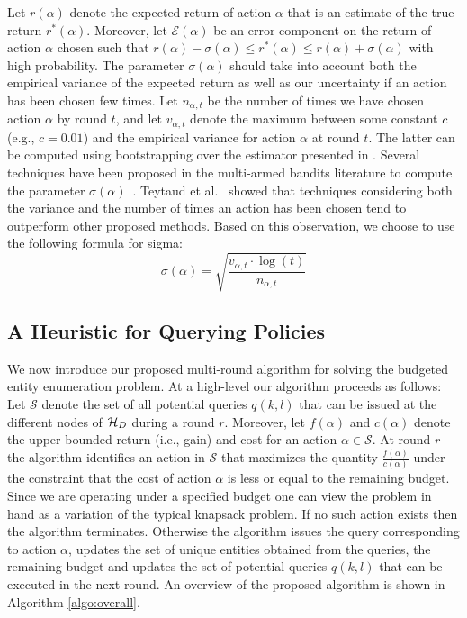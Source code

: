 Let $r(\alpha)$ denote the expected return of action $\alpha$ that is an estimate of the true return $r^*(\alpha)$. Moreover, let $\mathcal{E}(\alpha)$ be an error component on the return of action $\alpha$ chosen such that $r(\alpha) - \sigma(\alpha) \leq r^*(\alpha) \leq r(\alpha) + \sigma(\alpha)$ with high probability. The parameter $\sigma(\alpha)$ should take into account both the empirical variance of the expected return as well as our uncertainty if an action has been chosen few times. Let $n_{\alpha,t}$ be the number of times we have chosen action $\alpha$ by round $t$, and let $v_{\alpha,t}$ denote the maximum between some constant $c$ (e.g., $c = 0.01$) and the empirical variance for action $\alpha$ at round $t$. The latter can be computed using bootstrapping over the estimator presented in . Several techniques have been proposed in the multi-armed bandits literature to compute the parameter $\sigma(\alpha)$~\cite{teytaud:inria-00173263}. Teytaud et al.~\cite{teytaud:inria-00173263} showed that techniques considering both the variance and the number of times an action has been chosen tend to outperform other proposed methods. Based on this observation, we choose to use the following formula for sigma:
\begin{equation}
\label{eq:upper}
\sigma(\alpha) = \sqrt{\frac{v_{\alpha,t}\cdot\log(t)}{n_{\alpha,t}}}
\end{equation}

\subsection{A Heuristic for Querying Policies}
\label{sec:heuristic}
We now introduce our proposed multi-round algorithm for solving the budgeted entity enumeration problem. At a high-level our algorithm proceeds as follows: Let $\mathcal{S}$ denote the set of all potential queries $q(k,l)$ that can be issued at the different nodes of $\mathcal{H}_D$ during a round $r$. Moreover, let $f(\alpha)$ and $c(\alpha)$ denote the upper bounded return (i.e., gain) and cost for an action $\alpha \in \mathcal{S}$. At round $r$ the algorithm identifies an action in $\mathcal{S}$ that maximizes the quantity $\frac{f(\alpha)}{c(\alpha)}$ under the constraint that the cost of action $\alpha$ is less or equal to the remaining budget. Since we are operating under a specified budget one can view the problem in hand as a variation of the typical knapsack problem. If no such action exists then the algorithm terminates. Otherwise the algorithm issues the query corresponding to action $\alpha$, updates the set of unique entities obtained from the queries, the remaining budget and updates the set of potential queries $q(k,l)$ that can be executed in the next round.  An overview of the proposed algorithm is shown in Algorithm \ref{algo:overall}. 


